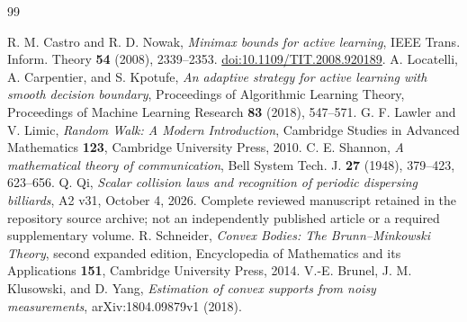 \begin{thebibliography}{99}
\raggedright
{}
R. M. Castro and R. D. Nowak, \emph{Minimax bounds for active learning},
IEEE Trans. Inform. Theory \textbf{54} (2008), 2339--2353.
\href{https://doi.org/10.1109/TIT.2008.920189}{doi:10.1109/TIT.2008.920189}.
A. Locatelli, A. Carpentier, and S. Kpotufe,
\emph{An adaptive strategy for active learning with smooth decision boundary},
Proceedings of Algorithmic Learning Theory, Proceedings of Machine
Learning Research \textbf{83} (2018), 547--571.
G. F. Lawler and V. Limic, \emph{Random Walk: A Modern Introduction},
Cambridge Studies in Advanced Mathematics \textbf{123}, Cambridge
University Press, 2010.
C. E. Shannon, \emph{A mathematical theory of communication},
Bell System Tech. J. \textbf{27} (1948), 379--423, 623--656.
Q. Qi, \emph{Scalar collision laws and recognition of periodic dispersing
billiards}, A2 v31, October 4, 2026. Complete reviewed manuscript retained in the repository source archive;
not an independently published article or a required supplementary volume.
R. Schneider, \emph{Convex Bodies: The Brunn--Minkowski Theory},
second expanded edition, Encyclopedia of Mathematics and its Applications
\textbf{151}, Cambridge University Press, 2014.
V.-E. Brunel, J. M. Klusowski, and D. Yang,
\emph{Estimation of convex supports from noisy measurements},
arXiv:1804.09879v1 (2018).
\end{thebibliography}
